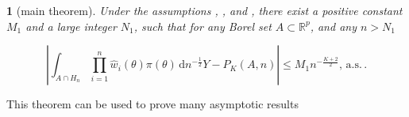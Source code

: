 \documentclass[oneside,english]{amsbook}
\numberwithin{section}{chapter}
\numberwithin{equation}{section}
\numberwithin{figure}{section}
\theoremstyle{plain}
\theoremstyle{plain}
\theoremstyle{definition}
\theoremstyle{plain}
\newtheorem{thm}{\protect\theoremname}
\theoremstyle{plain}
\theoremstyle{remark}
\theoremstyle{definition}
\theoremstyle{definition}
\newcommand{\diff}{\,\mathrm{d}}
\newcommand{\ascv}{\,\mathrm{a.s.}\,}
\providecommand{\theoremname}{Theorem}
\begin{document}
\begin{thm}[main theorem]
\label{thm:main-theorem}Under the assumptions ,
,  and ,
there exist a positive constant $M_{1}$ and a large integer $N_{1}$,
such that for any Borel set $A\subset\mathbb{R}^{p}$, and any $n>N_{1}$%

{} 
\[
\left|\int_{A\cap H_{n}}\prod_{i=1}^{n}\hat{w}_{i}\left(\theta\right)\pi\left(\theta\right)\diff n^{-\frac{1}{2}}Y-P_{K}\left(A,n\right)\right|\le M_{1}n^{-\frac{K+2}{2}},\ascv.
\]

\end{thm}

This theorem can be used to prove many asymptotic results
\end{document}
